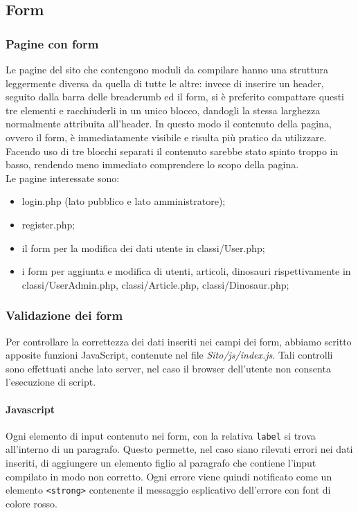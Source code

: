 \documentclass[12pt]{article}
\newcommand{\code}[1]{\texttt{#1}}
\begin{document}
	\subsection{Form}
	\subsubsection{Pagine con form}
	Le pagine del sito che contengono moduli da compilare hanno una struttura leggermente diversa da quella di tutte le altre: invece di inserire un header, seguito dalla barra delle breadcrumb ed il form, si è preferito compattare questi tre elementi e racchiuderli in un unico blocco, dandogli la stessa larghezza normalmente attribuita all'header. 
	In questo modo il contenuto della pagina, ovvero il form, è immediatamente visibile e risulta più pratico da utilizzare.\\Facendo uso di tre blocchi separati il contenuto sarebbe stato spinto troppo in basso, rendendo meno immediato comprendere lo scopo della pagina.\\
	Le pagine interessate sono:
	\begin{itemize}
		\item login.php (lato pubblico e lato amministratore);
		\item register.php;
		\item il form per la modifica dei dati utente in classi/User.php; 
		\item i form per aggiunta e modifica di utenti, articoli, dinosauri rispettivamente in classi/UserAdmin.php, classi/Article.php, classi/Dinosaur.php;
	\end{itemize}

	\subsubsection{Validazione dei form}
	Per controllare la correttezza dei dati inseriti nei campi dei form, abbiamo scritto apposite funzioni JavaScript, contenute nel file \textit{Sito/js/index.js}. Tali controlli sono effettuati anche lato server, nel caso il browser dell'utente non consenta l'esecuzione di script.
	\paragraph{Javascript}
	Ogni elemento di input contenuto nei form, con la relativa \code{label} si trova all'interno di un paragrafo. Questo permette, nel caso siano rilevati errori nei dati inseriti, di aggiungere un elemento figlio al paragrafo che contiene l'input compilato in modo non corretto.
	Ogni errore viene quindi notificato come un elemento \code{<strong>} contenente il messaggio esplicativo dell'errore con font di colore rosso.\\
	
\end{document}
